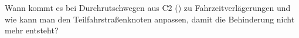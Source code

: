 

Wann kommt es bei Durchrutschwegen aus C2 (\textleftarrow) zu Fahrzeitverlägerungen und wie kann man den Teilfahrstraßenknoten anpassen, damit die Behinderung nicht mehr entsteht?
